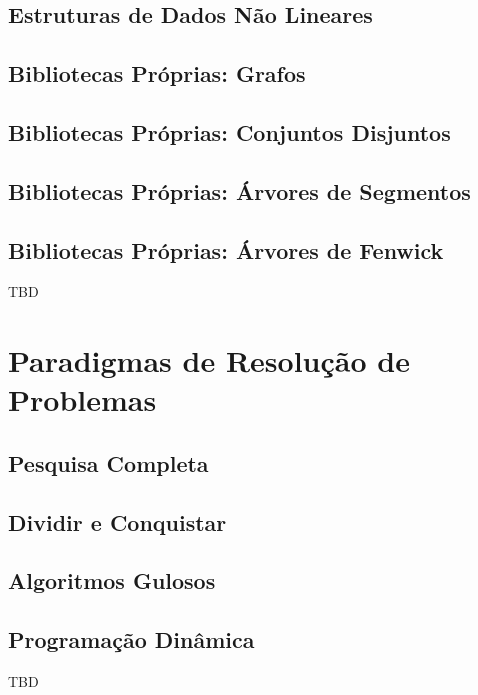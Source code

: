\documentclass[11pt]{scrartcl}
\begin{document}
\subsection{Estruturas de Dados Não Lineares}

\subsection{Bibliotecas Próprias: Grafos}

\subsection{Bibliotecas Próprias: Conjuntos Disjuntos}

\subsection{Bibliotecas Próprias: Árvores de Segmentos}

\subsection{Bibliotecas Próprias: Árvores de Fenwick}

TBD

\section{Paradigmas de Resolução de Problemas}

\subsection{Pesquisa Completa}

\subsection{Dividir e Conquistar}

\subsection{Algoritmos Gulosos}

\subsection{Programação Dinâmica}

TBD
\end{document}
